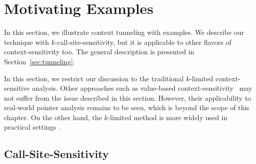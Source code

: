 
\section{Motivating Examples}
\label{sec:overview}

In this section, we illustrate context tunneling with examples.
We describe our technique with $k$-call-site-sensitivity, but it is applicable to other flavors of
context-sensitivity too. The general description
is presented in Section~\ref{sec:tunneling}.


In this section, we restrict our discussion to the
traditional $k$-limited context-sensitive analysis. %
Other approaches
such as value-based context-sensitivity~\cite{Khedker2008}
may not suffer from the issue described in this section.
However, their applicability to real-world pointer analysis remains to
be seen, which is beyond the scope of this chapter. On the other hand,
the $k$-limited method is more widely used in practical settings~\cite{Bravenboer2009,Smaragdakis2011,KastrinisS13a,Smaragdakis2014,JeJeChOh17}.






\subsection{Call-Site-Sensitivity}

